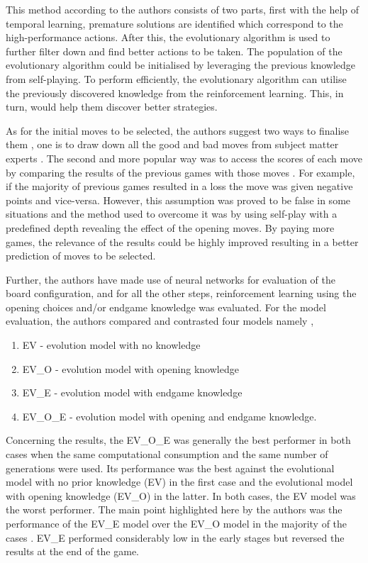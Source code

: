\documentclass{svproc}
\begin{document}
This method according to the authors consists of two parts, first with the help of temporal learning, premature solutions are identified which correspond to the high-performance actions. After this, the evolutionary algorithm is used to further filter down and find better actions to be taken. The population of the evolutionary algorithm could be initialised by leveraging the previous knowledge from self-playing. To perform efficiently, the evolutionary algorithm can utilise the previously discovered knowledge from the reinforcement learning. This, in turn, would help them discover better strategies.

As for the initial moves to be selected, the authors suggest two ways to finalise them , one is to draw down all the good and bad moves from subject matter experts \cite{esmond_2}. The second and more popular way was to access the scores of each move by comparing the results of the previous games with those moves \cite{esmond_2}. For example, if the majority of previous games resulted in a loss the move was given negative points and vice-versa. However, this assumption was proved to be false in some situations and the method used to overcome it was by using self-play with a predefined depth revealing the effect of the opening moves. By paying more games, the relevance of the results could be highly improved resulting in a better prediction of moves to be selected.

Further, the authors have made use of neural networks for evaluation of the board configuration, and for all the other steps, reinforcement learning using the opening choices and/or endgame knowledge was evaluated. For the model evaluation, the authors compared and contrasted four models namely \cite{esmond_2},

\begin{enumerate}
\item EV - evolution model with no knowledge
\item EV\_O - evolution model with opening knowledge
\item EV\_E - evolution model with endgame knowledge
\item EV\_O\_E - evolution model with opening and endgame knowledge.
\end{enumerate}

Concerning the results, the EV\_O\_E was generally the best performer in both cases when the same computational consumption and the same number of generations were used. Its performance was the best against the evolutional model with no prior knowledge (EV) in the first case and the evolutional model with opening knowledge (EV\_O) in the latter. In both cases, the EV model was the worst performer. The main point highlighted here by the authors was the performance of the EV\_E model over the EV\_O model in the majority of the cases \cite{esmond_2}. EV\_E performed considerably low in the early stages but reversed the results at the end of the game.
\end{document}
